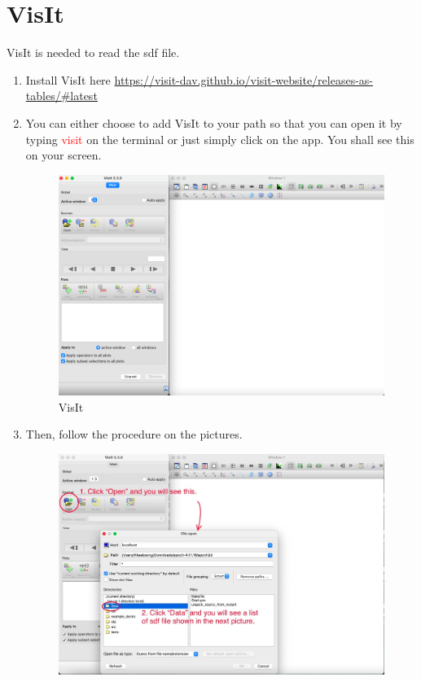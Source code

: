 \documentclass{article}
\begin{document}
\section{VisIt}
\noindent VisIt is needed to read the sdf file.
\begin{enumerate}
    \item Install VisIt here \url{https://visit-dav.github.io/visit-website/releases-as-tables/#latest}
    \item You can either choose to add VisIt to your path so that you can open it by typing \textcolor{red}{visit} on the terminal or just simply click on the app. You shall see this on your screen.
    \begin{figure}[htp]
        \centering
        \includegraphics[scale=0.3]{VisIt.png}
        \caption{VisIt}
        \label{fig:my_label}
    \end{figure}
    \item Then, follow the procedure on the pictures.
    \begin{figure}[htp]
        \centering
        \includegraphics[scale=0.3]{VisIt2.jpg}

\end{figure}
\end{enumerate}
\end{document}
